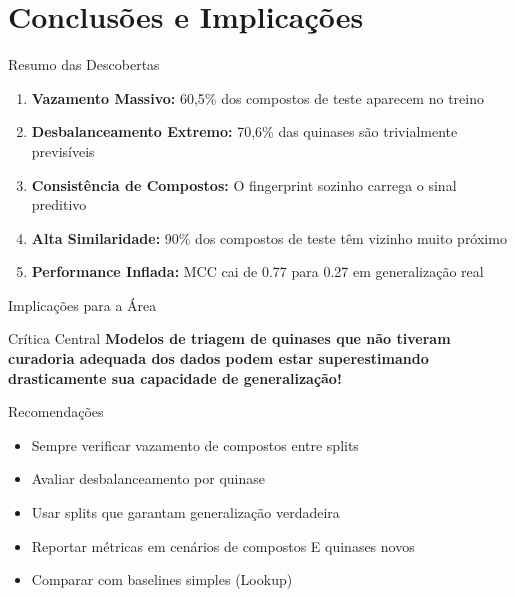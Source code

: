 \documentclass[aspectratio=169,11pt]{beamer}
\begin{document}
\section{Conclusões e Implicações}

\begin{frame}{Resumo das Descobertas}
    \begin{enumerate}
        \item \textbf{Vazamento Massivo:} 60,5\% dos compostos de teste aparecem no treino
        \vspace{0.3cm}
        \item \textbf{Desbalanceamento Extremo:} 70,6\% das quinases são trivialmente previsíveis
        \vspace{0.3cm}
        \item \textbf{Consistência de Compostos:} O fingerprint sozinho carrega o sinal preditivo
        \vspace{0.3cm}
        \item \textbf{Alta Similaridade:} 90\% dos compostos de teste têm vizinho muito próximo
        \vspace{0.3cm}
        \item \textbf{Performance Inflada:} MCC cai de 0.77 para 0.27 em generalização real
    \end{enumerate}
\end{frame}

\begin{frame}{Implicações para a Área}
    \begin{alertblock}{Crítica Central}
        \textbf{Modelos de triagem de quinases que não tiveram curadoria adequada dos dados podem estar superestimando drasticamente sua capacidade de generalização!}
    \end{alertblock}

    \vspace{0.5cm}
    \begin{block}{Recomendações}
        \begin{itemize}
            \item Sempre verificar vazamento de compostos entre splits
            \item Avaliar desbalanceamento por quinase
            \item Usar splits que garantam generalização verdadeira
            \item Reportar métricas em cenários de compostos E quinases novos
            \item Comparar com baselines simples (Lookup)
        \end{itemize}
    \end{block}
\end{frame}
\end{document}
